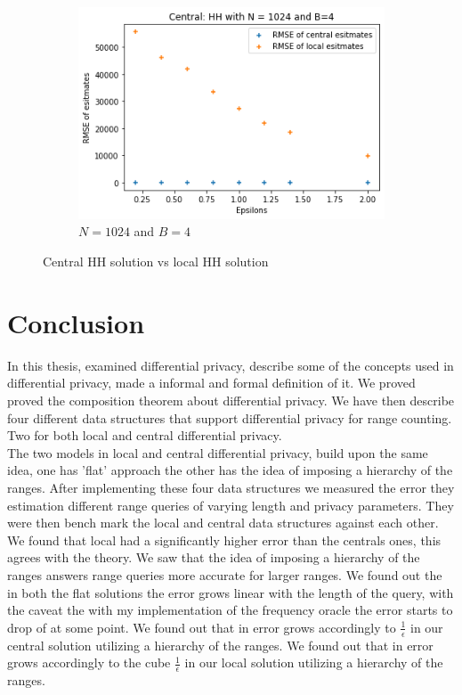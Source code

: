 \documentclass[11pt]{article}
\theoremstyle{definition}
\begin{document}
\begin{figure}[H]
\begin{subfigure}{.3\textwidth}
  \includegraphics[width=\linewidth]{figures/cen_vs_loc/hh/hh_beat_flat=1024_B=4.png}
  \caption{$N=1024$ and $B=4$}
  \label{fig:hh_vs1024}
\end{subfigure}
\caption{Central HH solution vs local HH solution}
\label{fig:hhhh_flat}
\end{figure}
\section{Conclusion}
In this thesis, examined differential privacy, describe some of the concepts used in differential privacy, made a informal and formal definition of it. We proved proved the composition theorem about differential privacy. We have then describe four different data structures that support differential privacy for range counting. Two for both local and central differential privacy. \\
The two models in local and central differential privacy, build upon the same idea, one has 'flat' approach the other has the idea of imposing a hierarchy of the ranges. 
After implementing these four data structures we measured the error they estimation different range queries of varying length and privacy parameters. They were then bench mark the local and central data structures against each other. We found that local had a significantly higher error than the centrals ones, this agrees with the theory. We saw that the idea of imposing a hierarchy of the ranges answers range queries more accurate for larger ranges. We found out the in both the flat solutions the error grows linear with the length of the query, with the caveat the with my implementation of the frequency oracle the error starts to drop of at some point. We found out that in error grows accordingly to $\frac{1}{\epsilon}$ in our central solution utilizing a hierarchy of the ranges. 
We found out that in error grows accordingly to the cube $\frac{1}{\epsilon}$ in our local solution utilizing a hierarchy of the ranges. 
\end{document}
